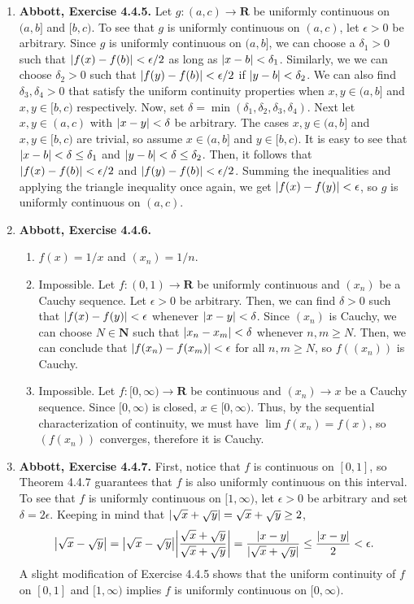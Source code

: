 \documentclass{article}
\DeclarePairedDelimiter\abs{\lvert}{\rvert}
\newcommand{\N}{\mathbf{N}}
\newcommand{\R}{\mathbf{R}}
\newcommand{\exc}[2][Abbott]{\item \textbf{#1, Exercise #2.}}
\newcommand{\lep}[1][L]{#1et $\epsilon > 0$ be arbitrary}
\begin{document}
\begin{enumerate}
    \exc{4.4.5}
    Let $g : (a,c) \to \R$ be uniformly continuous on $(a, b]$ and $[b, c)$. To see that $g$ is uniformly continuous on $(a, c)$, \lep[l]. Since $g$ is uniformly continuous on $(a, b]$, we can choose a $\delta_1 > 0$ such that $\abs{f(x)-f(b)} < \epsilon/2$ as long as $\abs{x-b} < \delta_1$. Similarly, we we can choose $\delta_2 > 0$ such that $\abs{f(y)-f(b)} < \epsilon/2$ if $\abs{y-b} < \delta_2$. We can also find $\delta_3, \delta_4 >0$ that satisfy the uniform continuity properties when $x,y \in (a,b]$ and $x,y \in [b,c)$ respectively. Now, set $\delta = \min(\delta_1, \delta_2, \delta_3, \delta_4)$. Next let $x,y \in (a, c)$ with $\abs{x-y} < \delta$ be arbitrary. The cases $x,y \in (a, b]$ and $x,y \in [b, c)$ are trivial, so assume $x \in (a, b]$ and $y \in [b, c)$. It is easy to see that $\abs{x-b} < \delta \leq \delta_1$ and $\abs{y-b} < \delta \leq \delta_2$. Then, it follows that $\abs{f(x)-f(b)} < \epsilon/2$ and $\abs{f(y)-f(b)} < \epsilon/2$. Summing the inequalities and applying the triangle inequality once again, we get $\abs{f(x)-f(y)} < \epsilon$, so $g$ is uniformly continuous on $(a, c)$.
    
    \exc{4.4.6}
    \begin{enumerate}
        \item $f(x) = 1/x$ and $(x_n) = 1/n$.
        
        \item Impossible. Let $f : (0, 1) \to \R$ be uniformly continuous and $(x_n)$ be a Cauchy sequence. \lep. Then, we can find $\delta > 0$ such that $\abs{f(x)-f(y)} < \epsilon$ whenever $\abs{x-y} < \delta$. Since $(x_n)$ is Cauchy, we can choose $N \in \N$ such that $\abs{x_n-x_m} < \delta$ whenever $n, m \geq N$. Then, we can conclude that $\abs{f(x_n)-f(x_m)} < \epsilon$ for all $n,m \geq N$, so $f((x_n))$ is Cauchy.
        
        \item Impossible. Let $f: [0, \infty) \to \R$ be continuous and $(x_n) \to x$ be a Cauchy sequence. Since $[0, \infty)$ is closed, $x \in [0, \infty)$. Thus, by the sequential characterization of continuity, we must have $\lim f(x_n) = f(x)$, so $(f(x_n))$ converges, therefore it is Cauchy.
    \end{enumerate} 
    
    \exc{4.4.7}
    First, notice that $f$ is continuous on $[0, 1]$, so Theorem 4.4.7 guarantees that $f$ is also uniformly continuous on this interval. To see that $f$ is uniformly continuous on $[1, \infty)$, \lep[l] and set $\delta = 2 \epsilon$. Keeping in mind that $\abs{\sqrt{x}+\sqrt{y}} = \sqrt{x}+\sqrt{y} \geq 2$,
    \begin{equation*}
        \abs*{\sqrt{x}-\sqrt{y}} = \abs*{\sqrt{x}-\sqrt{y}} \abs*{\frac{\sqrt{x}+\sqrt{y}}{\sqrt{x}+\sqrt{y}}} = 
        \frac{\abs{x-y}}{\abs{\sqrt{x}+\sqrt{y}}} \leq \frac{\abs{x-y}}{2} < \epsilon.
    \end{equation*} A slight modification of Exercise 4.4.5 shows that the uniform continuity of $f$ on $[0, 1]$ and $[1, \infty)$ implies $f$ is uniformly continuous on $[0, \infty)$.
    

\end{enumerate}
\end{document}
